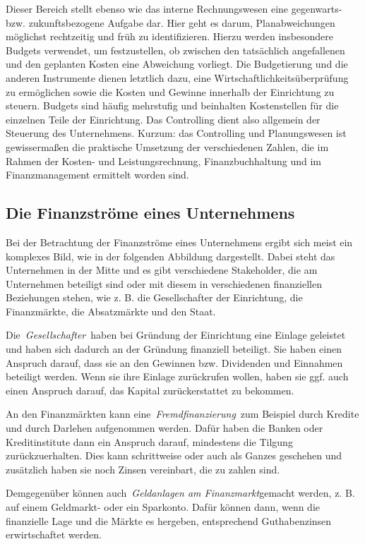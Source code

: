 \documentclass[
  letterpaper,
]{book}
\begin{document}
Dieser Bereich stellt ebenso wie das interne Rechnungswesen eine
gegenwarts- bzw. zukunftsbezogene Aufgabe dar. Hier geht es darum,
Planabweichungen möglichst rechtzeitig und früh zu identifizieren.
Hierzu werden insbesondere Budgets verwendet, um festzustellen, ob
zwischen den tatsächlich angefallenen und den geplanten Kosten eine
Abweichung vorliegt. Die Budgetierung und die anderen Instrumente dienen
letztlich dazu, eine Wirtschaftlichkeitsüberprüfung zu ermöglichen sowie
die Kosten und Gewinne innerhalb der Einrichtung zu steuern. Budgets
sind häufig mehrstufig und beinhalten Kostenstellen für die einzelnen
Teile der Einrichtung. Das Controlling dient also allgemein der
Steuerung des Unternehmens. Kurzum: das Controlling und Planungswesen
ist gewissermaßen die praktische Umsetzung der verschiedenen Zahlen, die
im Rahmen der Kosten- und Leistungsrechnung, Finanzbuchhaltung und im
Finanzmanagement ermittelt worden sind.

\subsection{Die Finanzströme eines
Unternehmens}\label{die-finanzstrme-eines-unternehmens}

Bei der Betrachtung der Finanzströme eines Unternehmens ergibt sich
meist ein komplexes Bild, wie in der folgenden Abbildung dargestellt.
Dabei steht das Unternehmen in der Mitte und es gibt verschiedene
Stakeholder, die am Unternehmen beteiligt sind oder mit diesem in
verschiedenen finanziellen Beziehungen stehen, wie z. B. die
Gesellschafter der Einrichtung, die Finanzmärkte, die Absatzmärkte und
den Staat.

Die~\emph{Gesellschafter}~haben bei Gründung der Einrichtung eine
Einlage geleistet und haben sich dadurch an der Gründung finanziell
beteiligt. Sie haben einen Anspruch darauf, dass sie an den Gewinnen
bzw. Dividenden und Einnahmen beteiligt werden. Wenn sie ihre Einlage
zurückrufen wollen, haben sie ggf. auch einen Anspruch darauf, das
Kapital zurückerstattet zu bekommen.

An den Finanzmärkten kann eine~\emph{Fremdfinanzierung}~zum Beispiel
durch Kredite und durch Darlehen aufgenommen werden. Dafür haben die
Banken oder Kreditinstitute dann ein Anspruch darauf, mindestens die
Tilgung zurückzuerhalten. Dies kann schrittweise oder auch als Ganzes
geschehen und zusätzlich haben sie noch Zinsen vereinbart, die zu zahlen
sind.

Demgegenüber können auch~\emph{Geldanlagen am Finanzmarkt}gemacht
werden, z. B. auf einem Geldmarkt- oder ein Sparkonto. Dafür können
dann, wenn die finanzielle Lage und die Märkte es hergeben, entsprechend
Guthabenzinsen erwirtschaftet werden.
\end{document}
